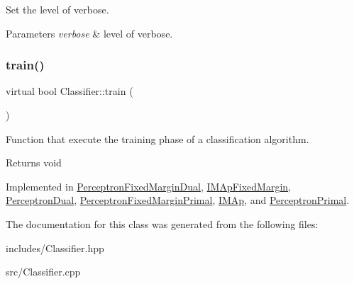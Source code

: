 Set the level of verbose. 


\begin{DoxyParams}{Parameters}
{\em verbose} & level of verbose. \\
\hline
\end{DoxyParams}
\mbox{\label{class_classifier_a2306a5de27555ab093593ac9642bc7d9}} 
\subsubsection{\texorpdfstring{train()}{train()}}
{\footnotesize\ttfamily virtual bool Classifier\+::train (\begin{DoxyParamCaption}{ }\end{DoxyParamCaption})\hspace{0.3cm}{\ttfamily [pure virtual]}}



Function that execute the training phase of a classification algorithm. 

\begin{DoxyReturn}{Returns}
void 
\end{DoxyReturn}


Implemented in \hyperlink{class_perceptron_fixed_margin_dual_aa095c90a3d04f70e1cf2e38e2afa769b}{Perceptron\+Fixed\+Margin\+Dual}, \hyperlink{class_i_m_ap_fixed_margin_ac43bc5733e6e749309277d3d99a86c11}{I\+M\+Ap\+Fixed\+Margin}, \hyperlink{class_perceptron_dual_a91b0bd1e86a6003b57b96199266cdc3e}{Perceptron\+Dual}, \hyperlink{class_perceptron_fixed_margin_primal_ad41c2a42c4a819c03bf9879110b0f99f}{Perceptron\+Fixed\+Margin\+Primal}, \hyperlink{class_i_m_ap_a6b6446fa6019518ae0336cb28af0b7f8}{I\+M\+Ap}, and \hyperlink{class_perceptron_primal_a17f817a72fc7d61d1686ea77f7f9e84d}{Perceptron\+Primal}.



The documentation for this class was generated from the following files\+:\begin{DoxyCompactItemize}
\item 
includes/Classifier.\+hpp\item 
src/Classifier.\+cpp\end{DoxyCompactItemize}
